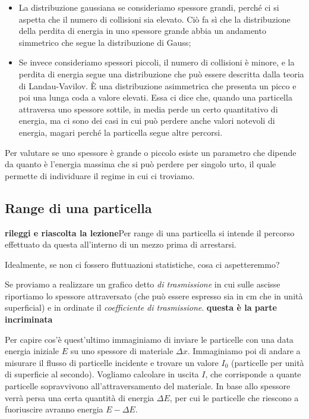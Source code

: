 \begin{itemize}
    \item La distribuzione gaussiana se consideriamo spessore grandi, perché ci si aspetta che il numero di collisioni sia elevato. Ciò fa sì che la distribuzione della perdita di energia in uno spessore grande abbia un andamento simmetrico che segue la distribuzione di Gauss;
    \item Se invece consideriamo spessori piccoli, il numero di collisioni è minore, e la perdita di energia segue una distribuzione che può essere descritta dalla teoria di Landau-Vavilov. È una distribuzione asimmetrica che presenta un picco e poi una lunga coda a valore elevati. Essa ci dice che, quando una particella attraversa uno spessore sottile, in media perde un certo quantitativo di energia, ma ci sono dei casi in cui può perdere anche valori notevoli di energia, magari perché la particella segue altre percorsi.
\end{itemize}

Per valutare se uno spessore è grande o piccolo esiste un parametro che dipende da quanto è l'energia massima che si può perdere per singolo urto, il quale permette di individuare il regime in cui ci troviamo.

\subsection{Range di una particella}

\textbf{rileggi e riascolta la lezione}Per range di una particella si intende il percorso effettuato da questa all'interno di un mezzo prima di arrestarsi.

Idealmente, se non ci fossero fluttuazioni statistiche, cosa ci aspetteremmo?

Se proviamo a realizzare un grafico detto \textit{di trasmissione} in cui sulle ascisse riportiamo lo spessore attraversato (che può essere espresso sia in cm che in unità superficial) e in ordinate il \textit{coefficiente di trasmissione}. \textbf{questa è la parte incriminata}

Per capire cos'è quest'ultimo immaginiamo di inviare le particelle con una data energia iniziale $E$ su uno spessore di materiale $\Delta x$. Immaginiamo poi di andare a misurare il flusso di particelle incidente e trovare un valore $I_0$ (particelle per unità di superficie al secondo). Vogliamo calcolare in uscita $I$, che corrisponde a quante particelle sopravvivono all'attraversamento del materiale. In base allo spessore verrà persa una certa quantità di energia $\Delta E$, per cui le particelle che riescono a fuoriuscire avranno energia $E - \Delta E$.

